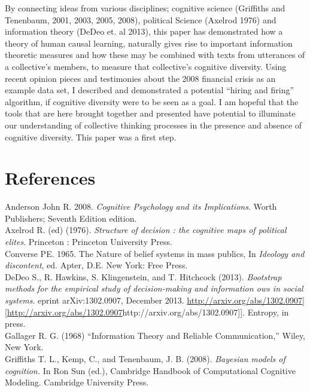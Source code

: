 \documentclass[11pt]{article}
\begin{document}
By connecting ideas from various disciplines; cognitive science (Griffiths and Tenenbaum, 2001, 2003, 2005, 2008), political Science (Axelrod 1976) and information theory (DeDeo et. al 2013), this paper has demonstrated how a theory of human causal learning, naturally gives rise to important information theoretic measures and how these may be combined with texts from utterances of a collective's members, to measure that collective's cognitive diversity. Using recent opinion pieces and testimonies about the 2008 financial crisis as an example data set, I described and demonstrated a potential ``hiring and firing'' algorithm, if cognitive diversity were to be seen as a goal. I am hopeful that the tools that are here brought together and presented have potential to illuminate our understanding of collective thinking processes in the presence and absence of cognitive diversity. This paper was a first step.
\section{References}
\label{sec-6}


Anderson John R. 2008. \textit{Cognitive Psychology and its Implications}. Worth Publishers; Seventh Edition edition.
\\


Axelrod R. (ed) (1976). \textit{Structure of decision : the cognitive maps of political elites}. Princeton : Princeton University Press.
\\



Converse PE. 1965. The Nature of belief systems in mass publics, In \textit{Ideology and discontent}, ed. Apter, D.E. New York: Free Press.
\\

DeDeo S., R. Hawkins, S. Klingenstein, and T. Hitchcock (2013). \textit{Bootstrap methods for the
empirical study of decision-making and information ows in social systems}. eprint
arXiv:1302.0907, December 2013. \href{[[http://arxiv.org/abs/1302.0907}{http://arxiv.org/abs/1302.0907][http://arxiv.org/abs/1302.0907}{http://arxiv.org/abs/1302.0907]]}. Entropy, in press.
\\

Gallager R. G. (1968) ``Information Theory and Reliable Communication,'' Wiley, New York.
\\

Griffiths T. L., Kemp, C., and Tenenbaum, J. B. (2008). \textit{Bayesian models of cognition.} In Ron Sun (ed.), Cambridge Handbook of Computational Cognitive Modeling. Cambridge University Press.
\\
\end{document}
